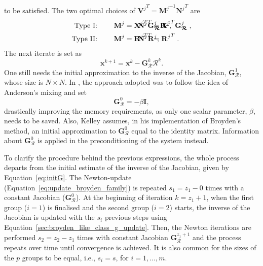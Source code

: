           to be satisfied.
          The two optimal choices of \({\mathbf{V}^j}^T = {\mathbf{M}^j}^{-1}{\mathbf{N}^j}^T\) are
          \begin{align}
            \text{Type I: } \qquad & {\mathbf{M}^j} = {\mathbf X^j}^T \mathbf{G}_{\bm{\mathcal{R}}}^j \mathbf R^j, && \hspace{-2cm} {\mathbf{N}^j}^T = {\mathbf X^j}^T \mathbf{G}_{\bm{\mathcal{R}}}^j\;, \label{eq:broyden_type_i}\\
            \text{Type II: } \qquad & {\mathbf{M}^j} = {\mathbf R^j}^T \mathbf R^j, && \hspace{-2cm} {\mathbf{N}^j}^T = {\mathbf R^j}^T\;. \label{eq:broyden_type_ii}
          \end{align}
          The next iterate is set as
          \begin{equation} \label{eq:update_broyden_family}
            \mathbf{x}^{k+1}=\mathbf{x}^{k}-\mathbf{G}_{\bm{\mathcal{R}}}^{k} \bm{\mathcal{R}}^k.
          \end{equation}
          One still needs the initial approximation to the inverse of the Jacobian, \(\mathbf{G}_{\bm{\mathcal{R}}}^1\), whose size is \(N\times N\).
          In \cite{fang_two_2009}, the approach adopted was to follow the idea of Anderson's mixing and set
          \begin{equation}
            \mathbf{G}_{\bm{\mathcal{R}}}^0 = - \beta \mathbf{I}, \label{eq:initG}
          \end{equation}
          drastically improving the memory requirements, as only one scalar parameter, \(\beta\), needs to be saved.
          Also, Kelley \citep{kelley_solving_2003} assumes, in his implementation of Broyden's method, an initial approximation to \(\mathbf{G}_{\bm{\mathcal{R}}}^0\) equal to the identity matrix.
          Information about \(\mathbf{G}_{\bm{\mathcal{R}}}^0\) is applied in the preconditioning of the system instead.

          To clarify the procedure behind the previous expressions, the whole process departs from the initial estimate of the inverse of the Jacobian, given by Equation~\eqref{eq:initG}.
          The Newton-update (Equation~\eqref{eq:update_broyden_family}) is repeated $s_{1}=z_{1}-0$ times with a constant Jacobian (\(\mathbf{G}_{\bm{\mathcal{R}}}^0\)).
          At the beginning of iteration $k=z_{1}+1$, when the first group ($i=1$) is finalised and the second group ($i=2$) starts, the inverse of the Jacobian is updated with the $s_{i}$ previous steps using Equation~\eqref{sec:broyden_like_class_g_update}.
          Then, the Newton iterations are performed $s_{2}=z_{2}-z_{1}$ times with constant Jacobian \(\mathbf{G}_{\bm{\mathcal{R}}}^{z_{1}+1}\) and the process repeats over time until convergence is achieved.
          It is also common for the sizes of the \(p\) groups to be equal, i.e., \(s_i=s\), for \(i=1,\dots,m\).

